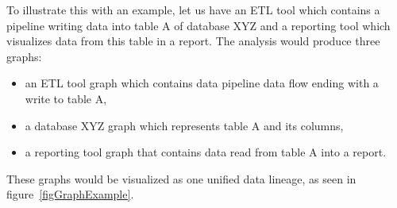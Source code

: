 \par
To illustrate this with an example, let us have an ETL tool which contains a pipeline writing data into table A of database XYZ and a reporting tool which visualizes data from this table in a report. The analysis would produce three graphs:
\begin{itemize}
    \item an ETL tool graph which contains data pipeline data flow ending with a write to table A,
    \item a database XYZ graph which represents table A and its columns,
    \item a reporting tool graph that contains data read from table A into a report. 
\end{itemize}
These graphs would be visualized as one unified data lineage, as seen in figure~\ref{figGraphExample}.

